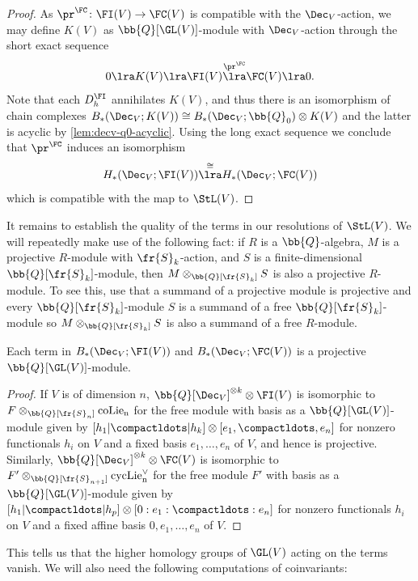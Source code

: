\documentclass[a4paper]{amsart}
\begin{document}
\begin{proof}As $\pr^\FC \colon \FI(V) \to \FC(V)$ is compatible with the $\Dec_V$-action, we may define $K(V)$ as $\bb{Q}[\GL(V)]$-module with $\Dec_V$-action through the short exact sequence
\[0 \lra K(V) \lra \FI(V) \overset{\pr^\FC}\lra \FC(V) \lra 0.\]
Note that each $D^\FI_h$ annihilates $K(V)$, and thus there is an isomorphism of chain complexes $B_*(\Dec_V;K(V)) \cong B_*(\Dec_V;\bb{Q}_0) \otimes K(V)$ and the latter is acyclic by \cref{lem:decv-q0-acyclic}. Using the long exact sequence we conclude that $\pr^\FC$ induces an isomorphism
\[H_*(\Dec_V;\FI(V)) \overset{\cong}\lra H_*(\Dec_V;\FC(V))\]
which is compatible with the map to $\StL(V)$.
\end{proof}

It remains to establish the quality of the terms in our resolutions of $\StL(V)$. We will repeatedly make use of the following fact: if $R$ is a $\bb{Q}$-algebra, $M$ is a projective $R$-module with $\fr{S}_k$-action, and $S$ is a finite-dimensional $\bb{Q}[\fr{S}_k]$-module, then $M \otimes_{\bb{Q}[\fr{S}_k]} S$ is also a projective $R$-module. To see this, use that a summand of a projective module is projective and every $\bb{Q}[\fr{S}_k]$-module $S$ is a summand of a free $\bb{Q}[\fr{S}_k]$-module so $M \otimes_{\bb{Q}[\fr{S}_k]} S$ is also a summand of a free $R$-module.

\begin{lemma} \label{lemma: resolution is projective} Each term in $B_*(\Dec_V;\FI(V))$ and $B_*(\Dec_V;\FC(V))$ is a projective $\bb{Q}[\GL(V)]$-module.\end{lemma}

\begin{proof} If $V$ is of dimension $n$, $\bb{Q}[\Dec_V]^{\otimes k} \otimes \FI(V)$ is isomorphic to $F \otimes_{\bb{Q}[\fr{S}_n]} \rm{coLie}_n$ for the free module with basis as a $\bb{Q}[\GL(V)]$-module given by $[h_1|\compactldots|h_k] \otimes [e_1,\compactldots,e_n]$ for nonzero functionals $h_i$ on $V$ and a fixed basis $e_1,\ldots,e_n$ of $V$, and hence is projective. Similarly, $\bb{Q}[\Dec_V]^{\otimes k} \otimes \FC(V)$ is isomorphic to $F' \otimes_{\bb{Q}[\fr{S}_{n+1}]} \rm{cycLie}_n^{\vee}$ for the free module $F'$ with basis as a $\bb{Q}[\GL(V)]$-module given by $[h_1|\compactldots|h_p] \otimes [0:e_1:\compactldots:e_n]$ for nonzero functionals $h_i$ on $V$ and a fixed affine basis $0,e_1,\ldots,e_n$ of $V$.
\end{proof}

This tells us that the higher homology groups of $\GL(V)$ acting on the terms vanish. We will also need the following computations of coinvariants:
\end{document}
